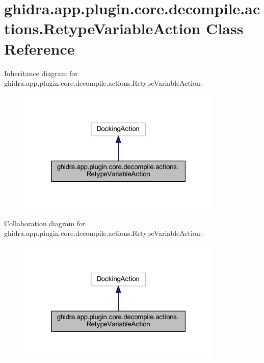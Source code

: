 \hypertarget{classghidra_1_1app_1_1plugin_1_1core_1_1decompile_1_1actions_1_1_retype_variable_action}{}\section{ghidra.\+app.\+plugin.\+core.\+decompile.\+actions.\+Retype\+Variable\+Action Class Reference}
\label{classghidra_1_1app_1_1plugin_1_1core_1_1decompile_1_1actions_1_1_retype_variable_action}


Inheritance diagram for ghidra.\+app.\+plugin.\+core.\+decompile.\+actions.\+Retype\+Variable\+Action\+:
\nopagebreak
\begin{figure}[H]
\begin{center}
\leavevmode
\includegraphics[width=277pt]{classghidra_1_1app_1_1plugin_1_1core_1_1decompile_1_1actions_1_1_retype_variable_action__inherit__graph}
\end{center}
\end{figure}


Collaboration diagram for ghidra.\+app.\+plugin.\+core.\+decompile.\+actions.\+Retype\+Variable\+Action\+:
\nopagebreak
\begin{figure}[H]
\begin{center}
\leavevmode
\includegraphics[width=277pt]{classghidra_1_1app_1_1plugin_1_1core_1_1decompile_1_1actions_1_1_retype_variable_action__coll__graph}
\end{center}
\end{figure}
